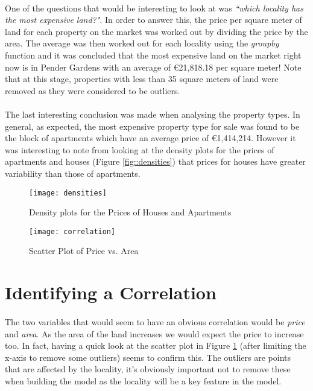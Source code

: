 \paragraph{ }One of the questions that would be interesting to look at was \textit{``which locality has the most expensive land?"}. In order to answer this, the price per square meter of land for each property on the market was worked out by dividing the price by the area. The average was then worked out for each locality using the \textit{groupby} function and it was concluded that the most expensive land on the market right now is in Pender Gardens with an average of \euro 21,818.18 per square meter! Note that at this stage, properties with less than 35 square meters of land were removed as they were considered to be outliers.

\paragraph{ }The last interesting conclusion was made when analysing the property types. In general, as expected, the most expensive property type for sale was found to be the block of apartments which have an average price of \euro1,414,214. However it was interesting to note from looking at the density plots for the prices of apartments and houses (Figure \ref{fig::densities}) that prices for houses have greater variability than those of apartments. 

\begin{figure}[!t]
	\begin{minipage}[b]{0.45\linewidth}
		\centering
		\texttt{[image: densities]}
		\caption[Price Densities]{Density plots for the Prices of Houses and Apartments}
		\label{fig::densities}
	\end{minipage}	
	\hspace{0.5cm}
	\begin{minipage}[b]{0.45\linewidth}
		\centering
		\texttt{[image: correlation]}
		\caption[Correlation Plot]{Scatter Plot of Price vs. Area}
		\label{fig::correlation}
	\end{minipage}	
\end{figure}


\section{Identifying a Correlation}
\paragraph{ }The two variables that would seem to have an obvious correlation would be \textit{price} and \textit{area}. As the area of the land increases we would expect the price to increase too. In fact, having a quick look at the scatter plot in Figure \ref{fig::correlation} (after limiting the x-axis to remove some outliers) seems to confirm this. The outliers are points that are affected by the locality, it's obviously important not to remove these when building the model as the locality will be a key feature in the model.

